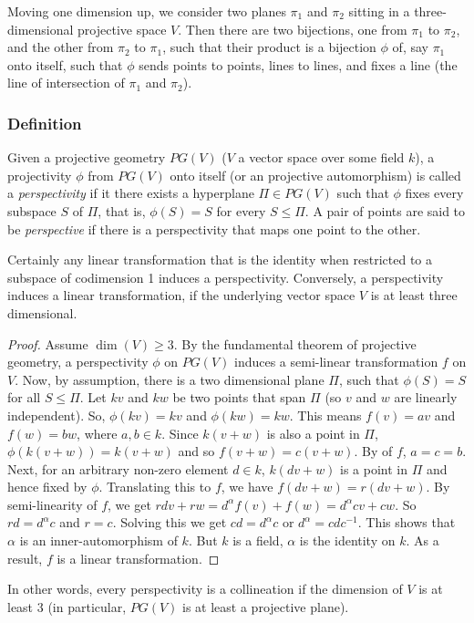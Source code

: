 \documentclass[12pt]{article}
\begin{document}
Moving one dimension up, we consider two planes $\pi_1$ and $\pi_2$ sitting in a
three-dimensional projective space $V$.  Then there are two bijections, one from
$\pi_1$ to $\pi_2$, and the other from $\pi_2$ to $\pi_1$, such that their product is a bijection $\phi$ of, say $\pi_1$ onto itself, such that $\phi$ sends points to points, lines to lines, and fixes a line (the line of intersection of $\pi_1$ and $\pi_2$).

\subsubsection*{Definition}
Given a projective geometry $PG(V)$ ($V$ a vector space over some field $k$), a
projectivity $\phi$ from $PG(V)$ onto itself (or an projective automorphism) is
called a \emph{perspectivity} if it there exists a hyperplane $\Pi\in PG(V)$ such that $\phi$ fixes every subspace $S$ of $\Pi$, that is, $\phi(S)=S$ for every $S\le \Pi$.  A pair of points are said to be \emph{perspective} if there is a perspectivity that maps one point to the other.

Certainly any linear transformation that is the identity when restricted to a subspace of codimension 1 induces a perspectivity.  Conversely, a perspectivity induces a linear transformation, if the underlying vector space $V$ is at least three dimensional.
\begin{proof}
Assume $\operatorname{dim}(V)\ge 3$.  By the fundamental theorem of projective geometry, a perspectivity $\phi$ on $PG(V)$ induces a semi-linear transformation $f$ on $V$.  Now, by assumption, there is a two dimensional plane $\Pi$, such that $\phi(S)=S$ for all $S\le \Pi$.  Let $kv$ and $kw$ be two points that span $\Pi$ (so $v$ and $w$ are linearly independent).  So, $\phi(kv)=kv$ and $\phi(kw)=kw$.  This means $f(v)=av$ and $f(w)=bw$, where $a,b\in k$.  Since $k(v+w)$ is also a point in $\Pi$, $\phi(k(v+w))=k(v+w)$ and so $f(v+w)=c(v+w)$.  By  of $f$, $a=c=b$.  Next, for an arbitrary non-zero element $d\in k$, $k(dv+w)$ is a point in $\Pi$ and hence fixed by $\phi$.  Translating this to $f$, we have $f(dv+w)=r(dv+w)$.  By semi-linearity of $f$, we get $rdv+rw=d^{\alpha}f(v)+f(w)=d^{\alpha}cv+cw$.  So $rd=d^{\alpha}c$ and $r=c$.  Solving this we get $cd=d^{\alpha}c$ or $d^{\alpha}=cdc^{-1}$.  This shows that $\alpha$ is an inner-automorphism of $k$.  But $k$ is a field, $\alpha$ is the identity on $k$.  As a result, $f$ is a linear transformation.  
\end{proof}
In other words, every perspectivity is a collineation if the dimension of $V$ is at least 3 (in particular, $PG(V)$ is at least a projective plane).
\end{document}
